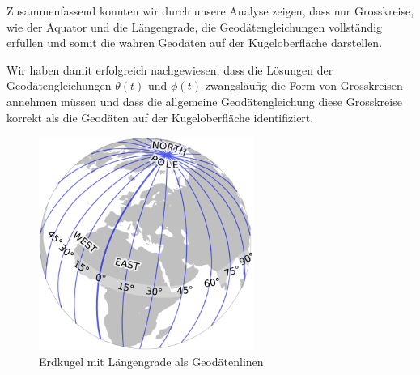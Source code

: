 Zusammenfassend konnten wir durch unsere Analyse zeigen, dass nur Grosskreise, wie der Äquator und die Längengrade, die Geodätengleichungen vollständig erfüllen und somit die wahren Geodäten auf der Kugeloberfläche darstellen.

Wir haben damit erfolgreich nachgewiesen, dass die Lösungen der Geodätengleichungen $\theta(t)$ und $\phi(t)$ zwangsläufig die Form von Grosskreisen annehmen müssen und dass die allgemeine Geodätengleichung diese Grosskreise korrekt als die Geodäten auf der Kugeloberfläche identifiziert.

\begin{figure}
	\centering
	\includegraphics[width=7cm]{papers/geodaeten/Abbildungen/Standardverfahren/StaKugelLaengengrade}
	\caption{Erdkugel mit Längengrade als Geodätenlinen}
	\label{geodaeten:figure:Standardverfahren:Laengengrade}
\end{figure}
